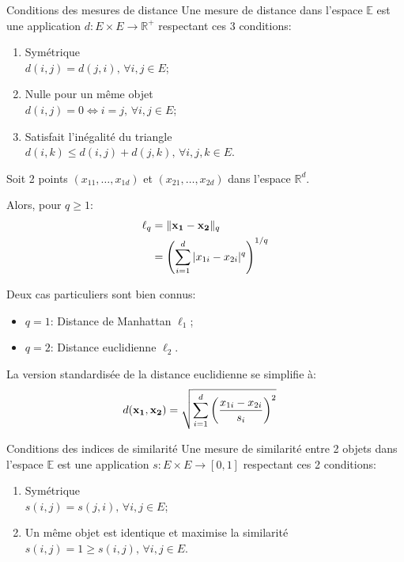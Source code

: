 \documentclass[10pt, french]{article}
\begin{document}
\begin{multicols*}{3}
\begin{conceptgen}{Conditions des mesures de distance}
Une mesure de distance dans l'espace $\mathbb{E}$ est une application $d : E \times E \rightarrow \mathbb{R}^{+}$ respectant ces 3 conditions:
\begin{enumerate}[leftmargin = *]
	\item	Symétrique\\
	$d(i, j) = d(j, i), \, \forall i, j \in E$;
	\item	Nulle pour un même objet\\
	$d(i, j) = 0 \Leftrightarrow i = j, \, \forall i, j \in E$;
	\item	Satisfait l'inégalité du triangle\\
	$d(i, k) \le d(i, j) + d(j, k), \, \forall i, j, k \in E$.
\end{enumerate}
\end{conceptgen}

\begin{definitionNOHFILL}
Soit 2 points $(x_{11}, \dots, x_{1d})$ et $(x_{21}, \dots, x_{2d})$ dans l'espace $\mathbb{R}^{d}$.

Alors, pour $q \ge 1$:
\begin{align*}
	\ell_{q}
	&=	\Vert \mathbf{x_{1} - x_{2}} \Vert_{q}	\\
	&=	\left( \sum_{i = 1}^{d} |x_{1i} - x_{2i}|^{q} \right)^{1/q}	\\
\end{align*}

Deux cas particuliers sont bien connus:
\begin{itemize}[leftmargin = *]
	\item	$q = 1$:	Distance de Manhattan $\ell_{1}$;
	\item	$q = 2$:	Distance euclidienne $\ell_{2}$.
\end{itemize}

\tcbline

La version standardisée de la distance euclidienne se simplifie à:
\begin{align*}
	d(\mathbf{x_{1}, x_{2}})
	&=	\sqrt{\sum_{i = 1}^{d} \left( \frac{x_{1i} - x_{2i}}{s_{i}} \right)^{2}}
\end{align*}
\end{definitionNOHFILL}

\begin{conceptgen}{Conditions des indices de similarité}
Une mesure de similarité entre 2 objets dans l'espace $\mathbb{E}$ est une application $s : E \times E \rightarrow [0, 1]$ respectant ces 2 conditions:
\begin{enumerate}[leftmargin = *]
	\item	Symétrique\\
	$s(i, j) = s(j, i), \, \forall i, j \in E$;
	\item	Un même objet est identique et maximise la similarité\\
	$s(i, j) = 1 \ge s(i, j), \, \forall i, j \in E$.
\end{enumerate}


\end{conceptgen}
\end{multicols*}
\end{document}
